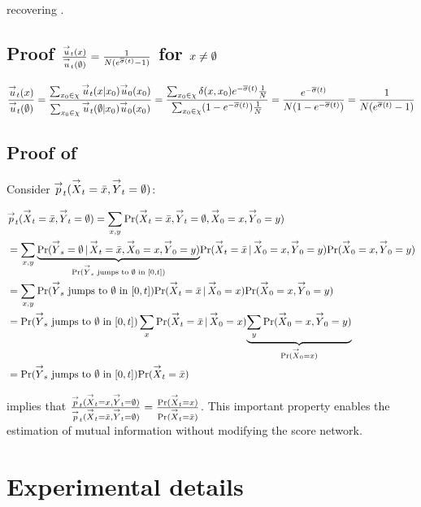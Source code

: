 recovering .

\subsection{Proof $\frac{\fu_t(x)}{\fu_t(\absorb)}=\ratio$ for $x\neq\absorb$}\label{sec:absorb_ratio}

{\small\begin{align}
    \frac{\fu_t(x)}{\fu_t(\absorb)} = \frac{\sum_{x_0\in\support}\fu_t(x|x_0)\fu_0(x_0)}{\sum_{x_0\in\support}\fu_t(\absorb|x_0)\fu_0(x_0)}
    = \frac{\sum_{x_0\in\support}\delta(x,x_0)e^{-\cumnoise(t)}\frac{1}{N}}{\sum_{x_0\in\support}(1-e^{-\cumnoise(t)})\frac{1}{N}} \nonumber = \frac{e^{-\cumnoise(t)}}{N(1-e^{-\cumnoise(t)})} = \ratio
\end{align}}

\subsection{Proof of }\label{sec:free_marginal}

Consider $\fp_t(\fproc_t=\xbar,\fprocy_t=\absorb)$:

\begin{align}\label{eq:marg_score}
    &\fp_t(\fproc_t=\xbar,\fprocy_t=\absorb) = \sum_{x,y}\prob(\fproc_t=\xbar, \fprocy_t=\absorb, \fproc_0=x,\fprocy_0=y)\\ &= \sum_{x,y}\underset{\pjump}{\underbrace{\prob(\fprocy_s=\absorb\g\fproc_t=\xbar,\fproc_0=x,\fprocy_0=y)}}\prob(\fproc_t=\xbar\g\fproc_0=x,\fprocy_0=y)\prob(\fproc_0=x,\fprocy_0=y) \nonumber \\ &= \sum_{x,y}\pjump\prob(\fproc_t=\xbar\g\fproc_0=x)\prob(\fproc_0=x,\fprocy_0=y) \nonumber \\ &= \pjump\sum_x\prob(\fproc_t=\xbar\g\fproc_0=x)\underset{\prob(\fproc_0=x)}{\underbrace{\sum_y\prob(\fproc_0=x,\fprocy_0=y)}} \nonumber \\ & = \pjump\prob(\fproc_t=\xbar) \nonumber
\end{align}

 implies that $\frac{\fp_t(\fproc_t=x,\fprocy_t=\absorb)}{\fp_t(\fproc_t=\xbar,\fprocy_t=\absorb)} = \frac{\prob(\fproc_t=x)}{\prob(\fproc_t=\xbar)}$. This important property enables the estimation of mutual information without modifying the score network. 




\section{Experimental details}

